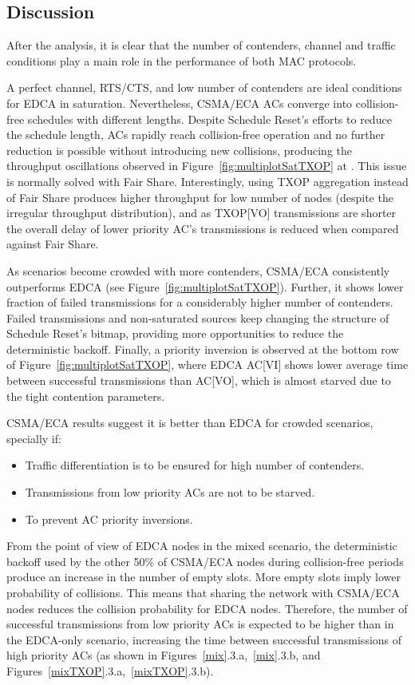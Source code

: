 \documentclass[a4paper]{article}
\begin{document}
\subsection{Discussion}
After the analysis, it is clear that the number of contenders, channel and traffic conditions play a main role in the performance of both MAC protocols. 

A perfect channel, RTS/CTS, and low number of contenders are ideal conditions for EDCA in saturation. Nevertheless, CSMA/ECA ACs converge into collision-free schedules with different lengths. Despite Schedule Reset's efforts to reduce the schedule length, ACs rapidly reach collision-free operation and no further reduction is possible without introducing new collisions, producing the throughput oscillations observed in Figure~\ref{fig:multiplotSatTXOP} at . This issue is normally solved with Fair Share. Interestingly, using TXOP aggregation instead of Fair Share produces higher throughput for low number of nodes (despite the irregular throughput distribution), and as TXOP[VO] transmissions are shorter the overall delay of lower priority AC's transmissions is reduced when compared against Fair Share.

As scenarios become crowded with more contenders, CSMA/ECA consistently outperforms EDCA (see Figure~\ref{fig:multiplotSatTXOP}). Further, it shows lower fraction of failed transmissions for a considerably higher number of contenders. Failed transmissions and non-saturated sources keep changing the structure of Schedule Reset's bitmap, providing more opportunities to reduce the deterministic backoff. Finally, a priority inversion is observed at the bottom row of Figure~\ref{fig:multiplotSatTXOP}, where EDCA AC[VI] shows lower average time between successful transmissions than AC[VO], which is almost starved due to the tight contention parameters.

CSMA/ECA results suggest it is better than EDCA for crowded scenarios, specially if:
	\begin{itemize}
		\item Traffic differentiation is to be ensured for high number of contenders.
		\item Transmissions from low priority ACs are not to be starved.
		\item To prevent AC priority inversions.
	\end{itemize}

From the point of view of EDCA nodes in the mixed scenario, the deterministic backoff used by the other 50\% of CSMA/ECA nodes during collision-free periods produce an increase in the number of empty slots. More empty slots imply lower probability of collisions. This means that sharing the network with CSMA/ECA nodes reduces the collision probability for EDCA nodes. Therefore, the number of successful transmissions from low priority ACs is expected to be higher than in the EDCA-only scenario, increasing the time between successful transmissions of high priority ACs (as shown in Figures~\ref{mix}.3.a,~\ref{mix}.3.b, and Figures~\ref{mixTXOP}.3.a,~\ref{mixTXOP}.3.b).
\end{document}
